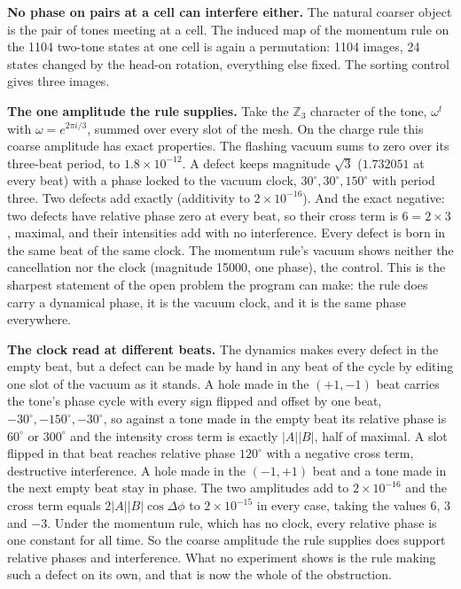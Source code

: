 \textbf{No phase on pairs at a cell can interfere either.} The natural coarser object is the pair of tones meeting at
a cell. The induced map of the momentum rule on the 1104 two-tone states at one cell is again a permutation: 1104
images, 24 states changed by the head-on rotation, everything else fixed. The sorting control gives three images.

\textbf{The one amplitude the rule supplies.} Take the $\mathbb{Z}_3$ character of the tone, $\omega^{t}$ with
$\omega = e^{2\pi i/3}$, summed over every slot of the mesh. On the charge rule this coarse amplitude has exact
properties. The flashing vacuum sums to zero over its three-beat period, to $1.8\times10^{-12}$. A defect keeps
magnitude $\sqrt3$ ($1.732051$ at every beat) with a phase locked to the vacuum clock, $30^\circ, 30^\circ, 150^\circ$
with period three. Two defects add exactly (additivity to $2\times10^{-16}$). And the exact negative: two defects have
relative phase zero at every beat, so their cross term is $6 = 2\times3$, maximal, and their intensities add with no
interference. Every defect is born in the same beat of the same clock. The momentum rule's vacuum shows neither the
cancellation nor the clock (magnitude 15000, one phase), the control. This is the sharpest statement of the open
problem the program can make: the rule does carry a dynamical phase, it is the vacuum clock, and it is the same phase
everywhere.

\textbf{The clock read at different beats.} The dynamics makes every defect in the empty beat, but a defect can be
made by hand in any beat of the cycle by editing one slot of the vacuum as it stands. A hole made in the $(+1,-1)$
beat carries the tone's phase cycle with every sign flipped and offset by one beat, $-30^\circ, -150^\circ,
-30^\circ$, so against a tone made in the empty beat its relative phase is $60^\circ$ or $300^\circ$ and the
intensity cross term is exactly $|A||B|$, half of maximal. A slot flipped in that beat reaches relative phase
$120^\circ$ with a negative cross term, destructive interference. A hole made in the $(-1,+1)$ beat and a tone made
in the next empty beat stay in phase. The two amplitudes add to $2\times10^{-16}$ and the cross term equals
$2|A||B|\cos\Delta\phi$ to $2\times10^{-15}$ in every case, taking the values $6$, $3$ and $-3$. Under the
momentum rule, which has no clock, every relative phase is one constant for all time. So the coarse amplitude the
rule supplies does support relative phases and interference. What no experiment shows is the rule making such a
defect on its own, and that is now the whole of the obstruction.

